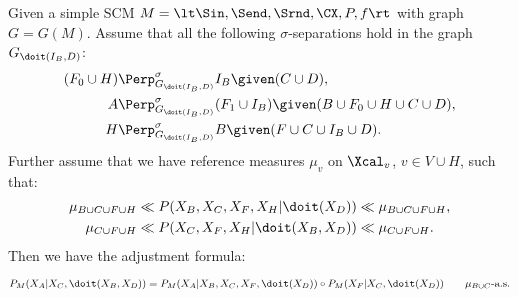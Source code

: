 \begin{Thm}\label{thm:gen-adjustment-scms}
Given a simple SCM $M = \lt \Sin, \Send, \Srnd, \CX, P, f \rt$ with graph $G = G(M)$. %
Assume that all the following $\sigma$-separations hold in the graph $G_{\doit(I_B,D)}$:
    \begin{align}
        (F_0 \cup H) & \Perp^\sigma_{G_{\doit(I_B,D)}} I_B \given (C \cup D), \\
        A & \Perp^\sigma_{G_{\doit(I_B,D)}} (F_1 \cup I_B) \given (B \cup F_0 \cup H \cup C \cup D), \\
                      H &\Perp^\sigma_{G_{\doit(I_B,D)}} B \given (F \cup C \cup  I_B \cup D).
    \end{align}
Further assume that we have reference measures $\mu_v$ on $\Xcal_v$, $v \in V \cup H$, such that:
  \begin{align*}
      \mu_{B \cup C \cup F \cup H} &\ll  P(X_B,X_C,X_F,X_H|\doit(X_D)) \ll \mu_{B \cup C \cup F \cup H},\\
      \mu_{C \cup F \cup H} &\ll  P(X_C,X_F,X_H|\doit(X_B,X_D)) \ll \mu_{C \cup F \cup H}.
  \end{align*}
Then we have the adjustment formula:
\[ P_{M}(X_A|X_C,\doit(X_B,X_D)) = P_{M}(X_A|X_B,X_C,X_F,\doit(X_D)) \circ P_{M}(X_F|X_C,\doit(X_D)) \qquad \mu_{B \cup C}\text{-a.s.} \]
\end{Thm}
